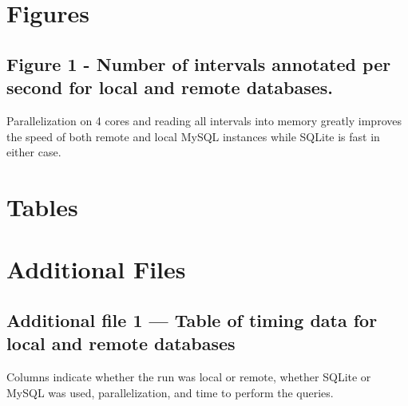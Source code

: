 \documentclass[10pt]{bmc_article}
\newenvironment{bmcformat}{\baselineskip20pt\sloppy\setboolean{publ}{false}}{\baselineskip20pt\sloppy}
\begin{document}
\begin{bmcformat}




\section*{Figures}
  \subsection*{Figure 1 - Number of intervals annotated per second for local and remote databases.}
  Parallelization on 4 cores and reading all intervals into memory greatly improves the speed of both remote and local MySQL instances while SQLite is fast in either case.




\section*{Tables}



\section*{Additional Files}
  \subsection*{Additional file 1 --- Table of timing data for local and remote databases}
  Columns indicate whether the run was local or remote, whether SQLite or MySQL was used,
  parallelization, and time to perform the queries.


\end{bmcformat}
\end{document}
